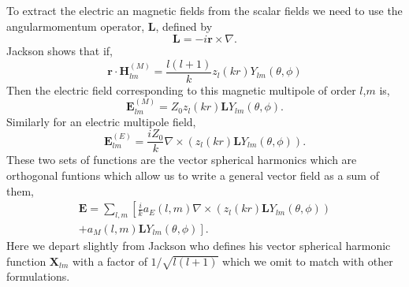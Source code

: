 \documentclass[aps,prl,twocolumn]{revtex4-1}
\begin{document}
To extract the electric an magnetic fields from the scalar fields we need
to use the angularmomentum operator, $\mathbf{L}$, defined by
\begin{equation}
  \label{eq:angularmomentum}
  \mathbf{L} = -i \mathbf{r} \times \nabla.
\end{equation}
Jackson shows that if,
\begin{equation}
  \label{eq:magneticmultipole}
  \mathbf{r}\cdot \mathbf{H}_{lm}^{(M)} = \frac{l(l+1)}{k} z_l(kr) 
                                        Y_{lm}(\theta,\phi)
\end{equation}
Then the electric field corresponding to this magnetic multipole of
order $l$,$m$ is,
\begin{equation}
  \label{eq:Efieldmagneticmultipole}
  \mathbf{E}_{lm}^{(M)} = Z_0 z_l(kr) \mathbf{L} Y_{lm}(\theta,\phi).
\end{equation}
Similarly for an electric multipole field,
\begin{equation}
  \label{eq:Efieldelectricmultipole}
  \mathbf{E}_{lm}^{(E)} =  \frac{i Z_0}{k} \nabla \times
                 ( z_l(kr) \mathbf{L} Y_{lm}(\theta,\phi)).
\end{equation}
These two sets of functions are the vector spherical harmonics which
are orthogonal funtions which allow us to write a general vector field
as a sum of them,
\begin{align}
  \label{eq:VSHsum}
  \mathbf{E} = \sum_{l,m} \left[\frac{i}{k} a_E(l,m) \nabla \times
                 ( z_l(kr) \mathbf{L} Y_{lm}(\theta,\phi)) \right. \\
                       \left.  +a_M(l,m) \mathbf{L} Y_{lm}(\theta,\phi)\right].
\end{align}
Here we depart slightly from Jackson who defines his vector spherical
harmonic function $\mathbf{X}_{lm}$ with a factor of $1/\sqrt{l(l+1)}$ which
we omit to match with other formulations. 
\end{document}
